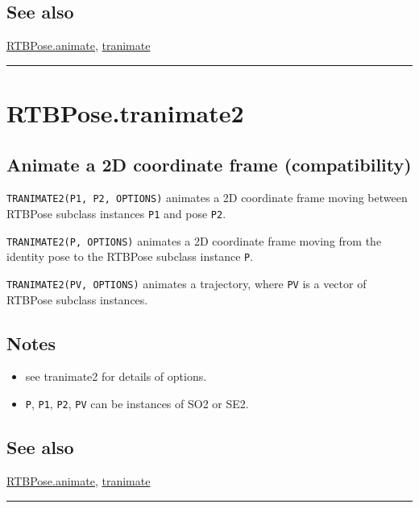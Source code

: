 \subsection*{See also}


\hyperlink{RTBPose.animate}{\color{blue} RTBPose.animate}, \hyperlink{tranimate}{\color{blue} tranimate}

\vspace{1.5ex}\hrule

\hypertarget{RTBPose.tranimate2}{\section*{RTBPose.tranimate2}}
\subsection*{Animate a 2D coordinate frame (compatibility)}


\texttt{TRANIMATE2(P1, P2, OPTIONS)} animates a 2D coordinate frame moving between
RTBPose subclass instances \texttt{P1} and pose \texttt{P2}.



\texttt{TRANIMATE2(P, OPTIONS)} animates a 2D coordinate frame moving from the identity pose
to the RTBPose subclass instance \texttt{P}.



\texttt{TRANIMATE2(PV, OPTIONS)} animates a trajectory, where \texttt{PV} is a vector of
RTBPose subclass instances.


\subsection*{Notes}
\begin{itemize}
  \item see tranimate2 for details of options.
  \item \texttt{P}, \texttt{P1}, \texttt{P2}, \texttt{PV} can be instances of SO2 or SE2.
\end{itemize}

\subsection*{See also}


\hyperlink{RTBPose.animate}{\color{blue} RTBPose.animate}, \hyperlink{tranimate}{\color{blue} tranimate}

\vspace{1.5ex}\hrule

